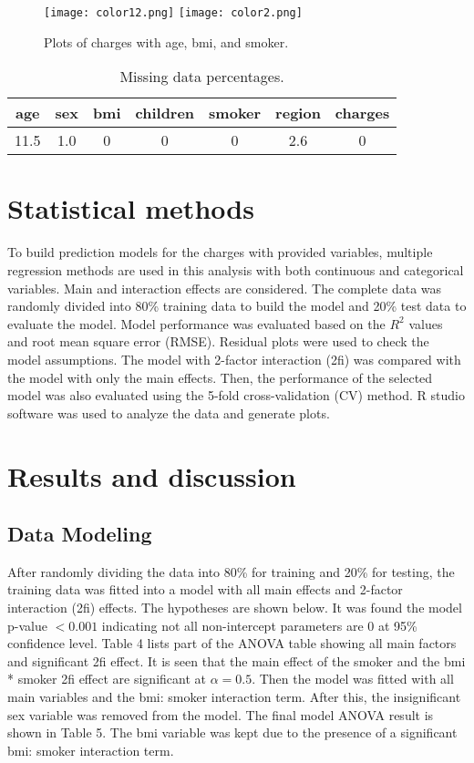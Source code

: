 \documentclass[12pt]{article}
\begin{document}
\begin{figure}[!htbp]
\texttt{[image: color12.png]}
\texttt{[image: color2.png]}
\caption{Plots of charges with age, bmi, and smoker.}
\label{fig:method}
\end{figure}

\begin{table}[ht]
\centering
\caption{ Missing data percentages.\label{data3}}
\begin{tabular}{|c|c|c|c|c|c|c|}\hline
age& sex& bmi& children& smoker& region& charges\\\hline
11.5& 1.0& 0& 0& 0& 2.6& 0 \\\hline
\end{tabular}
\end{table}

\section{Statistical methods}
To build prediction models for the charges with provided variables, multiple regression methods are used in this analysis with both continuous and categorical variables. Main and interaction effects are considered. The complete data was randomly divided into 80\% training data to build the model and 20\% test data to evaluate the model. Model performance was evaluated based on the $R^2$ values and root mean square error (RMSE). Residual plots were used to check the model assumptions. The model with 2-factor interaction (2fi) was compared with the model with only the main effects. Then, the performance of the selected model was also evaluated using the 5-fold cross-validation (CV) method. R studio software was used to analyze the data and generate plots. 

\section{Results and discussion}
\subsection{Data Modeling}
After randomly dividing the data into 80\% for training and 20\% for testing, the training data was fitted into a model with all main effects and 2-factor interaction (2fi) effects. The hypotheses are shown below. It was found the model p-value $<0.001$ indicating not all non-intercept parameters are 0 at 95\% confidence level. Table 4 lists part of the ANOVA table showing all main factors and significant 2fi effect. It is seen that the main effect of the smoker and the bmi * smoker 2fi effect are significant at $\alpha=0.5$. Then the model was fitted with all main variables and the bmi: smoker interaction term. After this, the insignificant sex variable was removed from the model. The final model ANOVA result is shown in Table 5. The bmi variable was kept due to the presence of a significant bmi: smoker interaction term. 
\medskip
\end{document}
